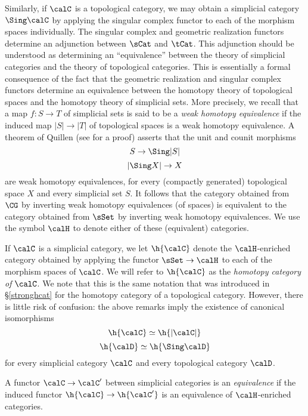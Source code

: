Similarly, if $\calC$ is a topological category, we may obtain a
simplicial category $\Sing \calC$ by applying the singular complex
functor to each of the morphism spaces individually. The singular complex and geometric realization functors determine an adjunction between $\sCat$ and $\tCat$.
This adjunction should be understood as determining an ``equivalence'' between the
theory of simplicial categories and the theory of topological categories. This is essentially a formal consequence of the fact that the geometric realization and singular complex functors determine an equivalence between the homotopy theory of topological spaces and the homotopy theory of simplicial sets. More precisely, we recall that a map $f: S \rightarrow T$ of simplicial sets is said to be a {\it weak homotopy equivalence} if the induced map $|S| \rightarrow |T|$ of topological spaces is a weak homotopy equivalence. A theorem of Quillen (see \cite{goerssjardine} for a proof) asserts that the unit and counit morphisms
$$ S \rightarrow \Sing |S| $$
$$ | \Sing X | \rightarrow X$$
are weak homotopy equivalences, for every (compactly generated) topological space $X$ and every simplicial set $S$. It follows that the category obtained from $\CG$ by inverting weak homotopy equivalences (of spaces) is equivalent to the category obtained from $\sSet$ by inverting weak homotopy equivalences. We use the symbol $\calH$ to denote either of these (equivalent) categories.

If $\calC$ is a simplicial category, we let $\h{\calC}$ denote the $\calH$-enriched category obtained by  applying the functor $\sSet \rightarrow \calH$ to each of the morphism spaces of $\calC$. We will refer to $\h{ \calC}$ as the {\it homotopy category of $\calC$}. We note that this is the same notation that was introduced in \S \ref{stronghcat} for the homotopy category of a topological category. However, there is little risk of confusion: the above remarks imply the existence of canonical isomorphisms
$$ \h{\calC} \simeq \h{ |\calC|}$$
$$ \h{\calD} \simeq \h{ \Sing \calD}$$
for every simplicial category $\calC$ and every topological category $\calD$.

\begin{definition}
A functor $\calC \rightarrow \calC'$ between simplicial categories is an {\it equivalence} if
the induced functor $\h{ \calC} \rightarrow \h{ \calC'}$ is an equivalence of $\calH$-enriched categories.
\end{definition}

